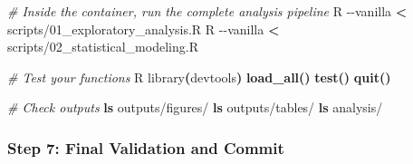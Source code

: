 \documentclass[
]{article}
\newenvironment{Shaded}{\begin{snugshade}}{\end{snugshade}}
\newcommand{\AttributeTok}[1]{\textcolor[rgb]{0.13,0.29,0.53}{#1}}
\newcommand{\CommentTok}[1]{\textcolor[rgb]{0.56,0.35,0.01}{\textit{#1}}}
\newcommand{\ErrorTok}[1]{\textcolor[rgb]{0.64,0.00,0.00}{\textbf{#1}}}
\newcommand{\ExtensionTok}[1]{#1}
\newcommand{\FunctionTok}[1]{\textcolor[rgb]{0.13,0.29,0.53}{\textbf{#1}}}
\newcommand{\KeywordTok}[1]{\textcolor[rgb]{0.13,0.29,0.53}{\textbf{#1}}}
\newcommand{\NormalTok}[1]{#1}
\newcommand{\OperatorTok}[1]{\textcolor[rgb]{0.81,0.36,0.00}{\textbf{#1}}}
\begin{document}
\begin{Shaded}
\begin{Highlighting}[]
\CommentTok{\# Inside the container, run the complete analysis pipeline}
\ExtensionTok{R} \AttributeTok{{-}{-}vanilla} \OperatorTok{\textless{}}\NormalTok{ scripts/01\_exploratory\_analysis.R}
\ExtensionTok{R} \AttributeTok{{-}{-}vanilla} \OperatorTok{\textless{}}\NormalTok{ scripts/02\_statistical\_modeling.R}

\CommentTok{\# Test your functions}
\ExtensionTok{R}
\ExtensionTok{library}\ErrorTok{(}\ExtensionTok{devtools}\KeywordTok{)}
\FunctionTok{load\_all()}
\FunctionTok{test()}
\FunctionTok{quit()}

\CommentTok{\# Check outputs}
\FunctionTok{ls}\NormalTok{ outputs/figures/}
\FunctionTok{ls}\NormalTok{ outputs/tables/}
\FunctionTok{ls}\NormalTok{ analysis/}
\end{Highlighting}
\end{Shaded}

\subsubsection{Step 7: Final Validation and
Commit}\label{step-7-final-validation-and-commit}
\end{document}
